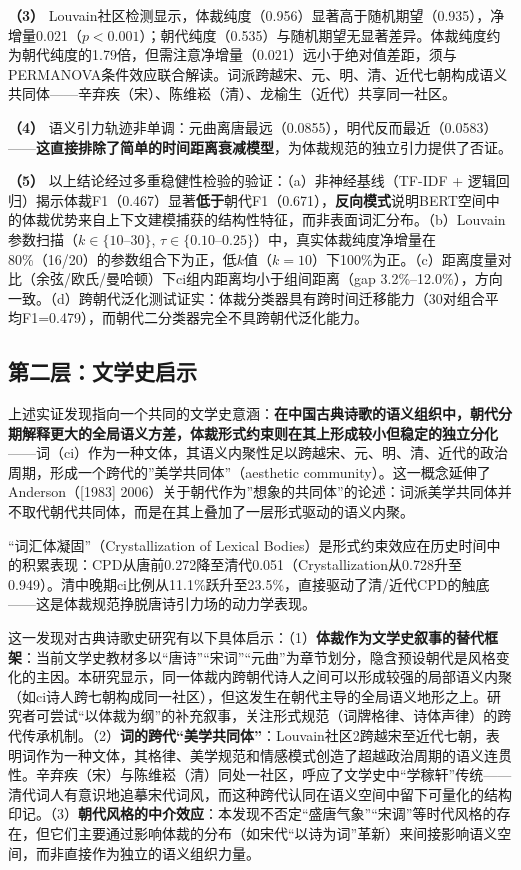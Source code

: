 \documentclass[12pt,a4paper]{article}
\numberwithin{equation}{section}
\begin{document}
\textbf{（3）} Louvain社区检测显示，体裁纯度（0.956）显著高于随机期望（0.935），净增量0.021（$p<0.001$）；朝代纯度（0.535）与随机期望无显著差异。体裁纯度约为朝代纯度的1.79倍，但需注意净增量（0.021）远小于绝对值差距，须与PERMANOVA条件效应联合解读。词派跨越宋、元、明、清、近代七朝构成语义共同体——辛弃疾（宋）、陈维崧（清）、龙榆生（近代）共享同一社区。

\textbf{（4）} 语义引力轨迹非单调：元曲离唐最远（0.0855），明代反而最近（0.0583）——\textbf{这直接排除了简单的时间距离衰减模型}，为体裁规范的独立引力提供了否证。

\textbf{（5）} 以上结论经过多重稳健性检验的验证：（a）非神经基线（TF-IDF + 逻辑回归）揭示体裁F1（0.467）显著\textbf{低于}朝代F1（0.671），\textbf{反向模式}说明BERT空间中的体裁优势来自上下文建模捕获的结构性特征，而非表面词汇分布。（b）Louvain参数扫描（$k\in\{10\text{--}30\}$, $\tau\in\{0.10\text{--}0.25\}$）中，真实体裁纯度净增量在80\%（16/20）的参数组合下为正，低$k$值（$k=10$）下100\%为正。（c）距离度量对比（余弦/欧氏/曼哈顿）下ci组内距离均小于组间距离（gap 3.2\%--12.0\%），方向一致。（d）跨朝代泛化测试证实：体裁分类器具有跨时间迁移能力（30对组合平均F1=0.479），而朝代二分类器完全不具跨朝代泛化能力。

\subsection*{第二层：文学史启示}

上述实证发现指向一个共同的文学史意涵：\textbf{在中国古典诗歌的语义组织中，朝代分期解释更大的全局语义方差，体裁形式约束则在其上形成较小但稳定的独立分化}——词（ci）作为一种文体，其语义内聚性足以跨越宋、元、明、清、近代的政治周期，形成一个跨代的”美学共同体”（aesthetic community）。这一概念延伸了Anderson（[1983] 2006）关于朝代作为”想象的共同体”的论述：词派美学共同体并不取代朝代共同体，而是在其上叠加了一层形式驱动的语义内聚。

“词汇体凝固”（Crystallization of Lexical Bodies）是形式约束效应在历史时间中的积累表现：CPD从唐前0.272降至清代0.051（Crystallization从0.728升至0.949）。清中晚期ci比例从11.1\%跃升至23.5\%，直接驱动了清/近代CPD的触底——这是体裁规范挣脱唐诗引力场的动力学表现。

这一发现对古典诗歌史研究有以下具体启示：（1）\textbf{体裁作为文学史叙事的替代框架}：当前文学史教材多以“唐诗”“宋词”“元曲”为章节划分，隐含预设朝代是风格变化的主因。本研究显示，同一体裁内跨朝代诗人之间可以形成较强的局部语义内聚（如ci诗人跨七朝构成同一社区），但这发生在朝代主导的全局语义地形之上。研究者可尝试“以体裁为纲”的补充叙事，关注形式规范（词牌格律、诗体声律）的跨代传承机制。（2）\textbf{词的跨代“美学共同体”}：Louvain社区2跨越宋至近代七朝，表明词作为一种文体，其格律、美学规范和情感模式创造了超越政治周期的语义连贯性。辛弃疾（宋）与陈维崧（清）同处一社区，呼应了文学史中“学稼轩”传统——清代词人有意识地追摹宋代词风，而这种跨代认同在语义空间中留下可量化的结构印记。（3）\textbf{朝代风格的中介效应}：本发现不否定“盛唐气象”“宋调”等时代风格的存在，但它们主要通过影响体裁的分布（如宋代“以诗为词”革新）来间接影响语义空间，而非直接作为独立的语义组织力量。
\end{document}
